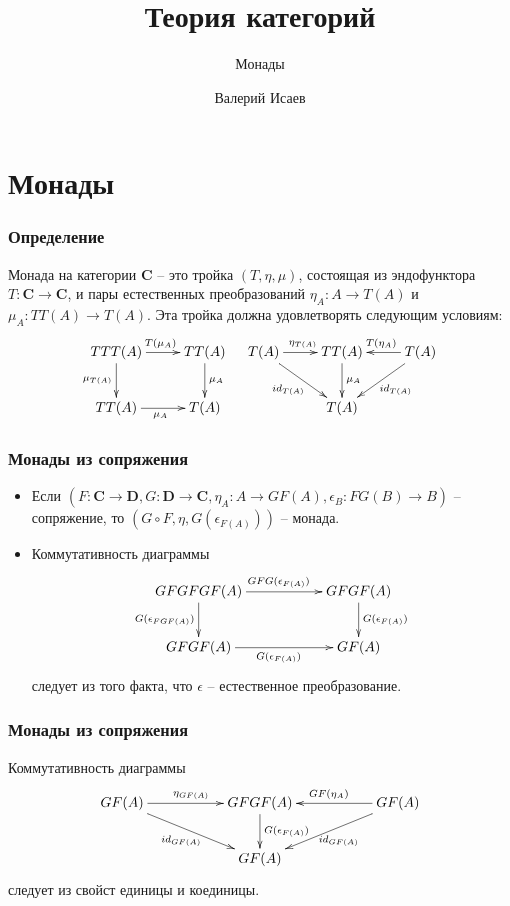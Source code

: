 \documentclass{beamer}
\theoremstyle{definition}
\newcommand{\cat}[1]{\mathbf{#1}}
\renewcommand{\C}{\cat{C}}
\newcommand{\D}{\cat{D}}
\begin{document}
\title{Теория категорий}
\subtitle{Монады}
\author{Валерий Исаев}
\maketitle

\section{Монады}

\begin{frame}
\frametitle{Определение}
\begin{defn}
Монада на категории $\C$ -- это тройка $(T,\eta,\mu)$, состоящая из эндофунктора $T : \C \to \C$, и пары естественных преобразований $\eta_A : A \to T(A)$ и $\mu_A : TT(A) \to T(A)$.
Эта тройка должна удовлетворять следующим условиям:
\[ \xymatrix{ TTT(A) \ar[r]^{T(\mu_A)} \ar[d]_{\mu_{T(A)} } & TT(A) \ar[d]^{\mu_A} \\
              TT(A) \ar[r]_{\mu_A}                          & T(A)
            }
\quad
   \xymatrix{ T(A) \ar[r]^{\eta_{T(A)}} \ar[rd]_{id_{T(A)}} & TT(A) \ar[d]^{\mu_A} & T(A) \ar[l]_{T(\eta_A)} \ar[dl]^{id_{T(A)}} \\
                                                            & T(A)
            } \]
\end{defn}
\end{frame}

\begin{frame}
\frametitle{Монады из сопряжения}
\begin{itemize}
\item Если $(F : \C \to \D, G : \D \to \C, \eta_A : A \to GF(A), \epsilon_B : FG(B) \to B)$ -- сопряжение, то $(G \circ F, \eta, G(\epsilon_{F(A)}))$ -- монада.
\item Коммутативность диаграммы
\[ \xymatrix{ GFGFGF(A) \ar[rr]^{GFG(\epsilon_{F(A)})} \ar[d]_{G(\epsilon_{FGF(A)})} & & GFGF(A) \ar[d]^{G(\epsilon_{F(A)})} \\
              GFGF(A) \ar[rr]_{G(\epsilon_{F(A)})}                                   & & GF(A)
            } \]
следует из того факта, что $\epsilon$ -- естественное преобразование.
\end{itemize}
\end{frame}

\begin{frame}
\frametitle{Монады из сопряжения}
Коммутативность диаграммы
\[ \xymatrix{ GF(A) \ar[rr]^{\eta_{GF(A)}} \ar[rrd]_{id_{GF(A)}} & & GFGF(A) \ar[d]^{G(\epsilon_{F(A)})} & & GF(A) \ar[ll]_{GF(\eta_A)} \ar[dll]^{id_{GF(A)}} \\
                                                                 & & GF(A)
            } \]
следует из свойст единицы и коединицы.
\end{frame}
\end{document}
